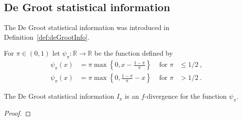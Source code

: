 \subsection{De Groot statistical information}

The De Groot statistical information was introduced in Definition~\ref{def:deGrootInfo}.

\begin{definition}
  \label{def:deGrootFun}
  \uses{}
  For $\pi \in (0,1)$ let $\psi_\pi : \mathbb{R} \to \mathbb{R}$ be the function defined by
  \begin{align*}
  \psi_\pi(x) &= \pi \max\left\{0, x - \frac{1 - \pi}{\pi}\right\} & \text{ for } \pi &\le 1/2 \: ,
  \\
  \psi_\pi(x) &= \pi \max\left\{0, \frac{1 - \pi}{\pi} - x\right\} & \text{ for } \pi &> 1/2 \: .
  \end{align*}
\end{definition}

\begin{lemma}
  \label{lem:deGrootInfo_eq_fDiv}
  The De Groot statistical information $I_\pi$ is an $f$-divergence for the function $\psi_\pi$.
\end{lemma}

\begin{proof}%
\uses{}

\end{proof}
